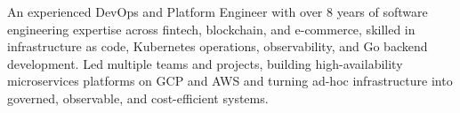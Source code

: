 

\begin{cvparagraph}

An experienced DevOps and Platform Engineer with over 8 years of software engineering expertise across fintech, blockchain, and e-commerce, skilled in infrastructure as code, Kubernetes operations, observability, and Go backend development. Led multiple teams and projects, building high-availability microservices platforms on GCP and AWS and turning ad-hoc infrastructure into governed, observable, and cost-efficient systems.
\end{cvparagraph}
